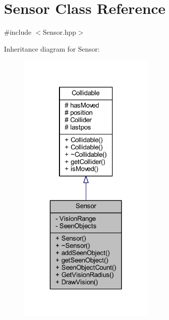 \hypertarget{class_sensor}{\section{Sensor Class Reference}
\label{class_sensor}
}


{\ttfamily \#include $<$Sensor.\-hpp$>$}



Inheritance diagram for Sensor\-:\nopagebreak
\begin{figure}[H]
\begin{center}
\leavevmode
\includegraphics[width=188pt]{class_sensor__inherit__graph}
\end{center}
\end{figure}


